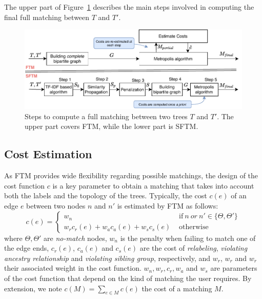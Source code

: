 The upper part of Figure~\ref{sftm:fig:steps} describes the main steps involved in computing the final full matching between $T$ and $T'$.

\begin{figure}
    \centering
	\includegraphics[width=\linewidth]{tree-matching/explanation/ftm-sftm-steps}
    \caption{Steps to compute a full matching between two trees $T$ and $T'$. The upper part covers FTM, while the lower part is SFTM.}
    \label{sftm:fig:steps}
\end{figure}

\subsection{Cost Estimation}\label{sftm:sec:FTM_cost}
As FTM provides wide flexibility regarding possible matchings, the design of the cost function $c$ is a key parameter to obtain a matching that takes into account both the labels and the topology of the trees.
Typically, the cost $c(e)$ of an edge $e$ between two nodes $n$ and $n'$ is estimated by FTM as follows:
\begin{equation}\label{eq:FTM_cost}
c(e) =
\begin{cases}
    w_n                                  & \text{ if}\ n\ or\ n' \in \{\Theta, \Theta'\} \\
    w_r c_r(e) + w_a c_a(e) + w_s c_s(e) & \text{ otherwise}
\end{cases}
\end{equation} 
where $\Theta, \Theta'$ are \textit{no-match} nodes, $w_n$ is the penalty when failing to match one of the edge ends, $c_r(e)$, $c_a(e)$ and $c_s(e)$ are the cost of \textit{relabeling}, \textit{violating ancestry relationship} and \textit{violating sibling group}, respectively, and $w_r$, $w_r$ and $w_r$ their associated weight in the cost function.
$w_n, w_r, c_r, w_a$ and $w_s$ are parameters of the cost function that depend on the kind of matching the user requires.
By extension, we note $c(M) = \sum_{e \in M} c(e)$ the cost of a matching $M$.

